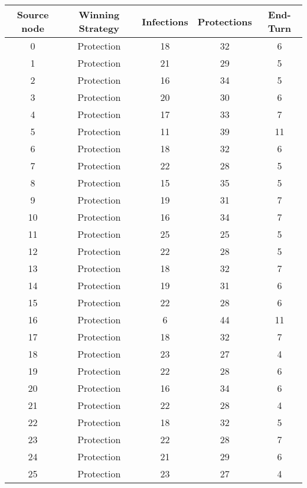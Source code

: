 \documentclass[results.tex]{subfiles}
\begin{document}
\begin{center}
  \begin{tabular}{| c || c | c | c | c |}
    \hline
    {\bfseries Source node} & {\bfseries Winning Strategy} & {\bfseries Infections} & {\bfseries Protections} & {\bfseries End-Turn} \\  %
    \hline\hline
    0 & Protection & 18 & 32 & 6 \\ 
    \hline
    1 & Protection & 21 & 29 & 5 \\ 
    \hline
    2 & Protection & 16 & 34 & 5 \\ 
    \hline
    3 & Protection & 20 & 30 & 6 \\ 
    \hline
    4 & Protection & 17 & 33 & 7 \\ 
    \hline
    5 & Protection & 11 & 39 & 11 \\ 
    \hline
    6 & Protection & 18 & 32 & 6 \\ 
    \hline
    7 & Protection & 22 & 28 & 5 \\ 
    \hline
    8 & Protection & 15 & 35 & 5 \\ 
    \hline
    9 & Protection & 19 & 31 & 7 \\ 
    \hline
    10 & Protection & 16 & 34 & 7 \\ 
    \hline
    11 & Protection & 25 & 25 & 5 \\ 
    \hline
    12 & Protection & 22 & 28 & 5 \\ 
    \hline
    13 & Protection & 18 & 32 & 7 \\ 
    \hline
    14 & Protection & 19 & 31 & 6 \\ 
    \hline
    15 & Protection & 22 & 28 & 6 \\ 
    \hline
    16 & Protection & 6 & 44 & 11 \\ 
    \hline
    17 & Protection & 18 & 32 & 7 \\ 
    \hline
    18 & Protection & 23 & 27 & 4 \\ 
    \hline
    19 & Protection & 22 & 28 & 6 \\ 
    \hline
    20 & Protection & 16 & 34 & 6 \\ 
    \hline
    21 & Protection & 22 & 28 & 4 \\ 
    \hline
    22 & Protection & 18 & 32 & 5 \\ 
    \hline
    23 & Protection & 22 & 28 & 7 \\ 
    \hline
    24 & Protection & 21 & 29 & 6 \\ 
    \hline
    25 & Protection & 23 & 27 & 4 \\ 

\end{tabular}
\end{center}
\end{document}
